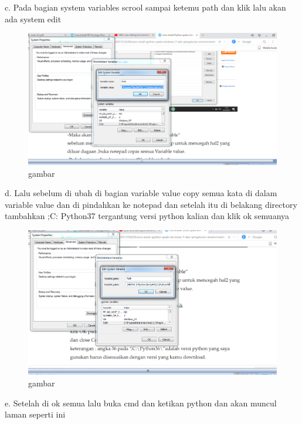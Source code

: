 \begin{enumerate}
c.	Pada bagian system variables scrool sampai ketemu path dan klik lalu akan ada system edit

  \begin{figure}
\begin{center} 
\includegraphics[scale=0.4]{src/soal3phyton3.PNG} 
\caption{gambar} 
\label{unhas} 
\end{center} 
\end{figure}

d.	Lalu sebelum di ubah di bagian variable value copy semua kata di dalam variable value dan di pindahkan ke notepad dan setelah itu di belakang directory tambahkan ;C: Python37 tergantung versi python kalian dan klik ok semuanya

  \begin{figure}
\begin{center} 
\includegraphics[scale=0.4]{src/soal3phyton4.PNG} 
\caption{gambar} 
\label{unhas} 
\end{center} 
\end{figure}

e.	Setelah di ok semua lalu buka cmd dan ketikan python dan akan muncul laman seperti ini


\end{enumerate}
